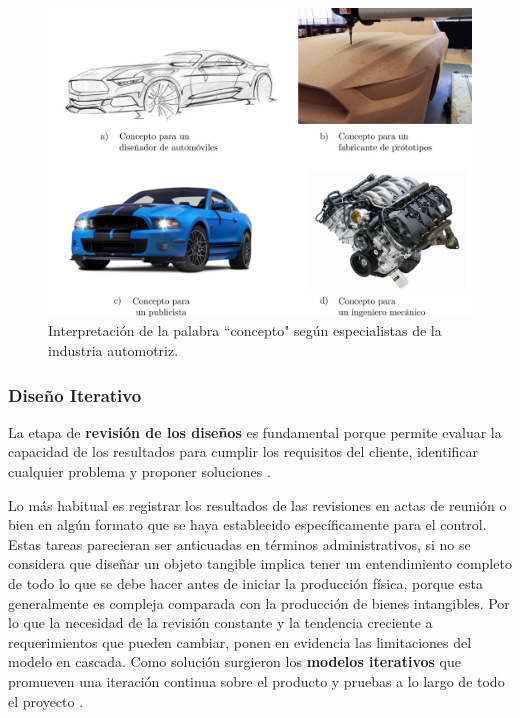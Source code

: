 \begin{figure}[ht]
\centering
\includegraphics[width=14cm]{Img/INTRO/intro-codesign1.jpg}
\caption{\footnotesize{Interpretación de la palabra ``concepto" según especialistas de la industria automotriz.}}
\label{fig:concept}
\end{figure}

\subsubsection{Diseño Iterativo}
\label{iterativo}

La etapa de \textbf{revisión de los diseños} es fundamental porque permite evaluar la capacidad de los resultados para cumplir los requisitos del cliente, identificar cualquier problema y proponer soluciones \citep{Pereiro2005}. 

Lo más habitual es registrar los resultados de las revisiones en actas de reunión o bien en algún formato que se haya establecido  específicamente para el control. 
Estas tareas parecieran ser anticuadas en términos administrativos, si no se considera que diseñar un objeto tangible implica tener un entendimiento completo de todo lo que se debe hacer antes de iniciar la producción física, porque esta generalmente es compleja comparada con la producción de bienes intangibles. Por lo que la necesidad de la revisión constante y la tendencia creciente a requerimientos que pueden cambiar, ponen en evidencia las limitaciones del modelo en cascada. Como solución surgieron los \textbf{modelos iterativos} que promueven una iteración continua sobre el producto y pruebas a lo largo de todo el proyecto  \citep{laurel2003design}.


